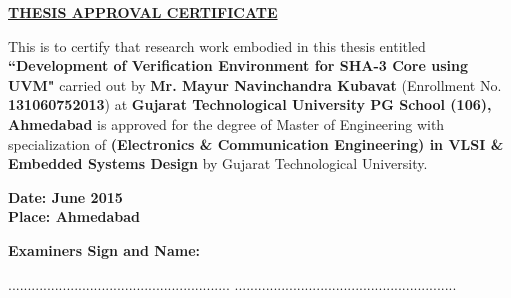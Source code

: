 \thispagestyle{plain}


\begin{center}
	\midsize\textbf{\underline {THESIS APPROVAL CERTIFICATE}}
\end{center}

This is to certify that research work embodied in this thesis entitled \textbf{``Development of Verification Environment for SHA-3 Core using UVM"} carried out by \textbf{Mr. Mayur Navinchandra Kubavat} (Enrollment No. \textbf{131060752013}) at \textbf{Gujarat Technological University PG School (106), Ahmedabad} is approved for the degree of Master of Engineering with specialization of \textbf{(Electronics \& Communication Engineering) in VLSI \& Embedded Systems Design} by Gujarat Technological University.

    \vspace {0.5cm}
    
    \textbf{Date: June 2015} \\
    \textbf{Place: Ahmedabad}
    
    \vspace {1.0cm}
    
	\textbf{Examiners Sign and Name:}
	\vspace{1.0cm}
	
	.........................................................				.........................................................
